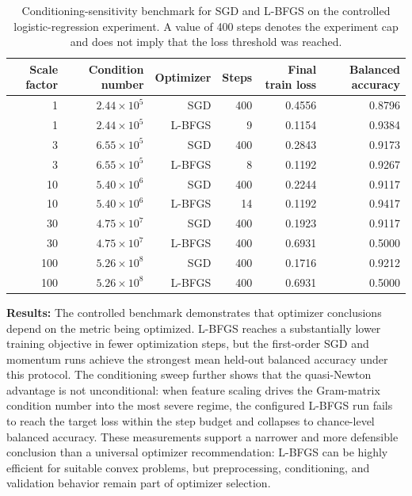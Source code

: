 \begin{table}[t]
\centering
\small
\caption{Conditioning-sensitivity benchmark for SGD and L-BFGS on the controlled logistic-regression experiment. A value of 400 steps denotes the experiment cap and does not imply that the loss threshold was reached.}
\label{tab:ch1-conditioning-benchmark}
\begin{tabular}{rrrrrr}
\toprule
Scale factor & Condition number & Optimizer & Steps & Final train loss & Balanced accuracy \\
\midrule
1   & $2.44\times10^{5}$ & SGD    & 400 & 0.4556 & 0.8796 \\
1   & $2.44\times10^{5}$ & L-BFGS & 9   & 0.1154 & 0.9384 \\
3   & $6.55\times10^{5}$ & SGD    & 400 & 0.2843 & 0.9173 \\
3   & $6.55\times10^{5}$ & L-BFGS & 8   & 0.1192 & 0.9267 \\
10  & $5.40\times10^{6}$ & SGD    & 400 & 0.2244 & 0.9117 \\
10  & $5.40\times10^{6}$ & L-BFGS & 14  & 0.1192 & 0.9417 \\
30  & $4.75\times10^{7}$ & SGD    & 400 & 0.1923 & 0.9117 \\
30  & $4.75\times10^{7}$ & L-BFGS & 400 & 0.6931 & 0.5000 \\
100 & $5.26\times10^{8}$ & SGD    & 400 & 0.1716 & 0.9212 \\
100 & $5.26\times10^{8}$ & L-BFGS & 400 & 0.6931 & 0.5000 \\
\bottomrule
\end{tabular}
\end{table}

\textbf{Results:} The controlled benchmark demonstrates that optimizer conclusions depend on the metric being optimized. L-BFGS reaches a substantially lower training objective in fewer optimization steps, but the first-order SGD and momentum runs achieve the strongest mean held-out balanced accuracy under this protocol. The conditioning sweep further shows that the quasi-Newton advantage is not unconditional: when feature scaling drives the Gram-matrix condition number into the most severe regime, the configured L-BFGS run fails to reach the target loss within the step budget and collapses to chance-level balanced accuracy. These measurements support a narrower and more defensible conclusion than a universal optimizer recommendation: L-BFGS can be highly efficient for suitable convex problems, but preprocessing, conditioning, and validation behavior remain part of optimizer selection.

